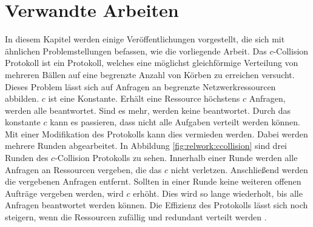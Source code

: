 \chapter{Verwandte Arbeiten}
\label{chap:relwork}
%
In diesem Kapitel werden einige Veröffentlichungen vorgestellt, die sich mit ähnlichen Problemstellungen befassen, wie die vorliegende Arbeit.
Das $c$-Collision Protokoll \cite{ccol3} ist ein Protokoll, welches eine möglichst gleichförmige Verteilung von mehreren Bällen auf eine begrenzte Anzahl von Körben zu erreichen versucht. Dieses Problem lässt sich auf Anfragen an begrenzte Netzwerkressourcen abbilden. $c$ ist eine Konstante. Erhält eine Ressource höchstens $c$ Anfragen, werden alle beantwortet. Sind es mehr, werden keine beantwortet. Durch das konstante $c$ kann es passieren, dass nicht alle Aufgaben verteilt werden können. Mit einer Modifikation des Protokolls kann dies vermieden werden. Dabei werden mehrere Runden abgearbeitet. In Abbildung \ref{fig:relwork:ccollision} sind drei Runden des $c$-Collision Protokolls zu sehen. Innerhalb einer Runde werden alle Anfragen an Ressourcen vergeben, die das $c$ nicht verletzen. Anschließend werden die vergebenen Anfragen entfernt. Sollten in einer Runde keine weiteren offenen Aufträge vergeben werden, wird $c$ erhöht. Dies wird so lange wiederholt, bis alle Anfragen beantwortet werden können. Die Effizienz des Protokolls lässt sich noch steigern, wenn die Ressourcen zufällig und redundant verteilt werden \cite{ccol4}.
